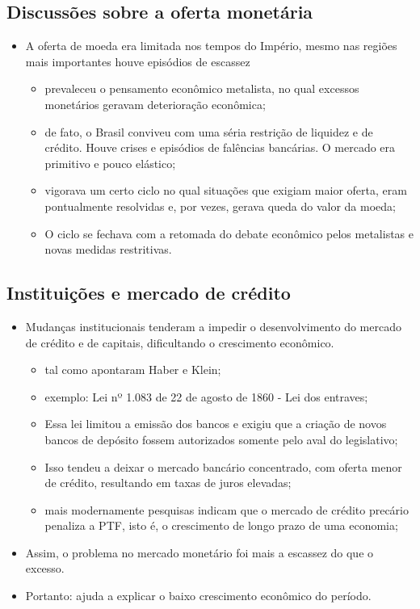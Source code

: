 \documentclass[a4paper,12pt]{article}[abntex2]
\begin{document}
\subsection{\textbf{Discussões sobre a oferta monetária}}
\begin{itemize}
    \item A oferta de moeda era limitada nos tempos do Império, mesmo nas regiões mais importantes houve episódios de escassez
    \begin{itemize}
        \item prevaleceu o pensamento econômico metalista, no qual excessos monetários geravam deterioração econômica;
    \end{itemize}
    \begin{itemize}
        \item  de fato, o Brasil conviveu com uma séria restrição de liquidez e de crédito. Houve crises e episódios de falências bancárias. O mercado era primitivo e pouco elástico;
    \end{itemize}
    \begin{itemize}
        \item vigorava um certo ciclo no qual situações que exigiam maior oferta, eram pontualmente resolvidas e, por vezes, gerava queda do valor da moeda;
    \end{itemize}
    \begin{itemize}
        \item O ciclo se fechava com a retomada do debate econômico pelos metalistas e novas medidas restritivas.
    \end{itemize}

 
\end{itemize}
\subsection{\textbf{Instituições e mercado de crédito}}
\begin{itemize}
    \item Mudanças institucionais tenderam a impedir o desenvolvimento do mercado de crédito e de capitais, dificultando o crescimento econômico.
    \begin{itemize}
        \item tal como apontaram Haber e Klein;
        \item exemplo: Lei nº 1.083 de 22 de agosto de 1860 - Lei dos entraves;
        \item Essa lei limitou a emissão dos bancos e exigiu que a criação de novos bancos de depósito fossem autorizados somente pelo aval do legislativo;
        \item Isso tendeu a deixar o mercado bancário concentrado, com oferta menor de crédito, resultando em taxas de juros elevadas;
        \item mais modernamente pesquisas indicam que o mercado de crédito precário penaliza a PTF, isto é, o crescimento de longo prazo de uma economia;
    \end{itemize}
    \item Assim, o problema no mercado monetário foi mais a escassez do que o excesso.
    \item Portanto: ajuda a explicar o baixo crescimento econômico do período.
\end{itemize}
\end{document}
